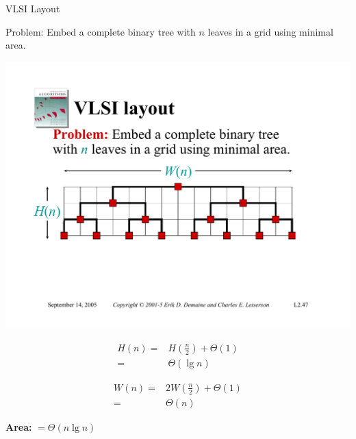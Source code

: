 \documentclass{beamer}
\begin{document}
\begin{frame}{VLSI Layout}
    \begin{exampleblock}{Problem:}
        Embed a complete binary tree with $n$ leaves in a grid using minimal area.
    \end{exampleblock}
    \centering
    \includegraphics[width=\textwidth, trim={1cm 5cm 2cm 7cm}, clip]{pages/lec3_47}
    \begin{minipage}{0.48\textwidth}
        \begin{equation*}
            \begin{split}
                H(n) =& H\left(\frac{n}{2}\right) + \Theta(1) \\
                    =& \Theta(\lg n)
            \end{split}
        \end{equation*}
    \end{minipage}
    \hfill
    \begin{minipage}{0.48\textwidth}
        \pause
        \begin{equation*}
            \begin{split}
                W(n) =& 2W\left(\frac{n}{2}\right) + \Theta(1) \\
                    =& \Theta(n)
            \end{split}
        \end{equation*}
    \end{minipage}
    \pause
    \begin{exampleblock}{ }
        \centering
        \Large
        \textbf{Area:} $ = \Theta(n \lg n)$
    \end{exampleblock}
\end{frame}
\end{document}
